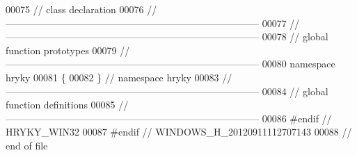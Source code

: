 \begin{DoxyCode}
00075 \textcolor{comment}{// class declaration}
00076 \textcolor{comment}{//
      ------------------------------------------------------------------------------}
00077 \textcolor{comment}{//
      ------------------------------------------------------------------------------}
00078 \textcolor{comment}{// global function prototypes}
00079 \textcolor{comment}{//
      ------------------------------------------------------------------------------}
00080 \textcolor{keyword}{namespace }hryky
00081 \{
00082 \} \textcolor{comment}{// namespace hryky}
00083 \textcolor{comment}{//
      ------------------------------------------------------------------------------}
00084 \textcolor{comment}{// global function definitions}
00085 \textcolor{comment}{//
      ------------------------------------------------------------------------------}
00086 \textcolor{preprocessor}{#endif // HRYKY\_WIN32}
00087 \textcolor{preprocessor}{}\textcolor{preprocessor}{#endif // WINDOWS\_H\_20120911112707143}
00088 \textcolor{preprocessor}{}\textcolor{comment}{// end of file}
\end{DoxyCode}
